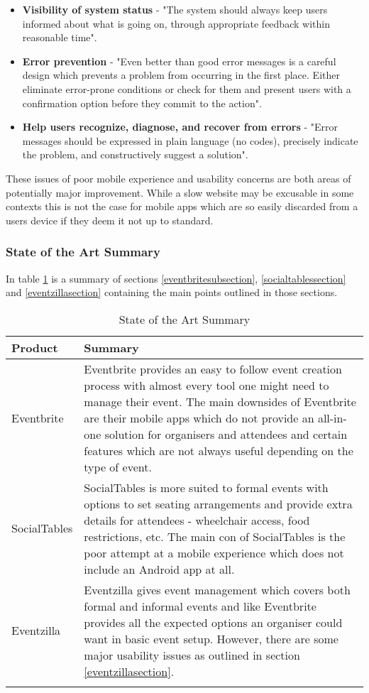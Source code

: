 \begin{itemize}
    \item \textbf{Visibility of system status} - "The system should always keep users informed about what is going on, through appropriate feedback within reasonable time"\cite{heuristics}.
    \item \textbf{Error prevention} - "Even better than good error messages is a careful design which prevents a problem from occurring in the first place. Either eliminate error-prone conditions or check for them and present users with a confirmation option before they commit to the action"\cite{heuristics}.
    \item \textbf{Help users recognize, diagnose, and recover from errors} - "Error messages should be expressed in plain language (no codes), precisely indicate the problem, and constructively suggest a solution"\cite{heuristics}.
\end{itemize}

These issues of poor mobile experience and usability concerns are both areas of potentially major improvement. While a slow website may be excusable in some contexts this is not the case for mobile apps which are so easily discarded from a users device if they deem it not up to standard.

\subsubsection{State of the Art Summary}

In table \ref{stateoftheartsummarytable} is a summary of sections \ref{eventbritesubsection}, \ref{socialtablessection} and \ref{eventzillasection} containing the main points outlined in those sections.

\begin{longtable}{ |p{4cm}|p{10cm}|  }
		\hline
		\hline
		\textbf{Product} & \textbf{Summary} \\
		\hline
		Eventbrite & Eventbrite provides an easy to follow event creation process with almost every tool one might need to manage their event. The main downsides of Eventbrite are their mobile apps which do not provide an all-in-one solution for organisers and attendees and certain features which are not always useful depending on the type of event.\\
		\hline
		SocialTables & SocialTables is more suited to formal events with options to set seating arrangements and provide extra details for attendees - wheelchair access, food restrictions, etc. The main con of SocialTables is the poor attempt at a mobile experience which does not include an Android app at all.\\
		\hline
		Eventzilla & Eventzilla gives event management which covers both formal and informal events and like Eventbrite provides all the expected options an organiser could want in basic event setup. However, there are some major usability issues as outlined in section \ref{eventzillasection}.\\
		\hline
    \caption{State of the Art Summary}
	\label{stateoftheartsummarytable}
\end{longtable}

